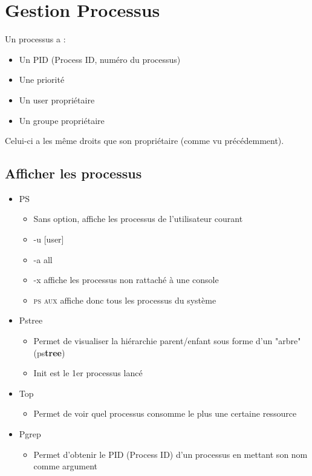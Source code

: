 \documentclass[a4paper]{article}
\begin{document}
      \section{Gestion Processus}
      Un processus a :
      \begin{itemize}[label = \textbullet, font = \Large]
        \item Un PID (Process ID, numéro du processus)
        \item Une priorité
        \item Un user propriétaire
        \item Un groupe propriétaire
      \end{itemize}
      Celui-ci a les même droits que son propriétaire (comme vu précédemment).

      \subsection{Afficher les processus}
      \begin{itemize}[label = \textbullet, font = \Large]
        \item \textsc{PS}
        \begin{itemize}[label=, font=\scriptsize] 
          \item Sans option, affiche les processus de l'utilisateur courant
          \item -u [user]
          \item -a all
          \item -x affiche les processus non rattaché à une console
          \item \textsc{ps aux} affiche donc tous les processus du système
        \end{itemize}
        \item Pstree
        \begin{itemize}[label=, font=\scriptsize] 
          \item Permet de visualiser la hiérarchie parent/enfant sous forme d'un "arbre" (ps\textbf{tree})
          \item Init est le 1er processus lancé
        \end{itemize}
        \item Top
        \begin{itemize}[label=, font=\scriptsize] 
          \item Permet de voir quel processus consomme le plus une certaine ressource
        \end{itemize}
        \item Pgrep
        \begin{itemize}[label=, font=\scriptsize] 
          \item Permet d'obtenir le PID (Process ID) d'un processus en mettant son nom comme argument
        \end{itemize}
      \end{itemize}
\end{document}
